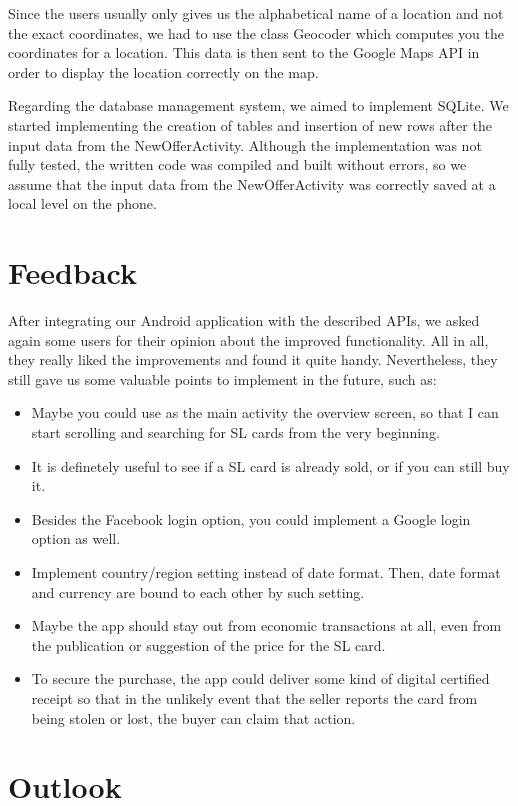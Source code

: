\documentclass[11pt,twoside,a4paper]{report}
\begin{document}
Since the users usually only gives us the alphabetical name of a location and not the exact coordinates, we had to use the class Geocoder which computes you the coordinates for a location. This data is then sent to the Google Maps API in order to display the location correctly on the map.

Regarding the database management system, we aimed to implement SQLite. We started implementing the creation of tables and insertion of new rows after the input data from the NewOfferActivity. Although the implementation was not fully tested, the written code was compiled and built without errors, so we assume that the input data from the NewOfferActivity was correctly saved at a local level on the phone.

\section{Feedback}

After integrating our Android application with the described APIs, we asked again some users for their opinion about the improved functionality. All in all, they really liked the improvements and found it quite handy. Nevertheless, they still gave us some valuable points to implement in the future, such as:

\begin{itemize}
\item Maybe you could use as the main activity the overview screen, so that I can start scrolling and searching for SL cards from the very beginning.
\item It is definetely useful to see if a SL card is already sold, or if you can still buy it.
\item Besides the Facebook login option, you could implement a Google login option as well.
\item Implement country/region setting instead of date format. Then, date format and currency are bound to each other by such setting.
\item Maybe the app should stay out from economic transactions at all, even from the publication or suggestion of the price for the SL card.
\item To secure the purchase, the app could deliver some kind of digital certified receipt so that in the unlikely event that the seller reports the card from being stolen or lost, the buyer can claim that action.
\end{itemize}

\section{Outlook}
\end{document}
